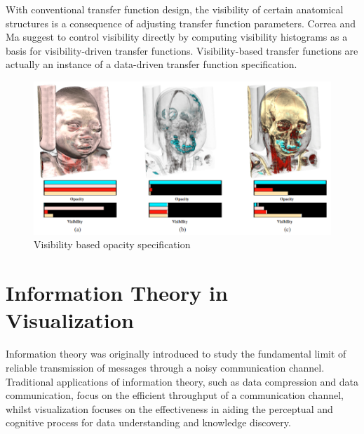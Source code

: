 With conventional transfer function design, the visibility of certain anatomical structures is a consequence of adjusting transfer function parameters. 
Correa and Ma suggest to control visibility directly by computing visibility histograms as a basis for visibility-driven transfer functions. Visibility-based transfer functions are actually an instance of a data-driven transfer function specification.

\cite{bordoloi_view_2005}
\cite{takahashi_feature-driven_2005}

\cite{emsenhuber_visibility_2008}
\cite{correa_visibility_2011}
\cite{wang_efficient_2011}

\begin{figure}
	\centering
	\includegraphics[width=1\linewidth]{images/wang_efficient_2011}
	\caption{Visibility based opacity specification \cite{wang_efficient_2011}}
	\label{fig:wang_efficient_2011}
\end{figure}

\cite{bronstad_visibility_2012}

\cite{jung_visibility-driven_2013}
\cite{zheng_visibility_2013}
\cite{ruiz_automatic_2011}
\cite{bramon_information_2013}

\section{Information Theory in Visualization}
Information theory \cite{shannon_mathematical_1948} was originally introduced to study the fundamental limit of reliable transmission of messages through a noisy communication channel. Traditional applications of information theory, such as data compression and data communication, focus on the efficient throughput of a communication channel, whilst visualization focuses on the effectiveness in aiding the perceptual and cognitive process for data understanding and knowledge discovery.

